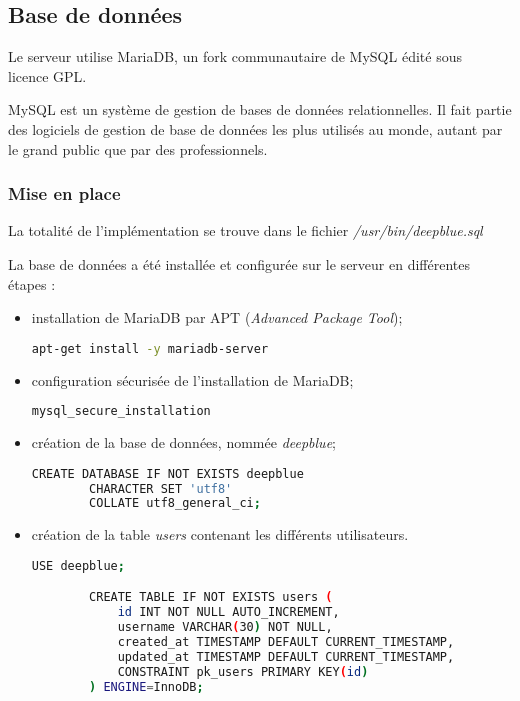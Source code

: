 \subsection{Base de données}
\label{subsec:bd}

Le serveur utilise MariaDB, un fork communautaire de MySQL édité sous \\
licence GPL.

MySQL est un système de gestion de bases de données relationnelles. Il fait
partie des logiciels de gestion de base de données les plus utilisés au monde,
autant par le grand public que par des professionnels.

\subsubsection{Mise en place}
\label{subsubsec:mise-en-place}

La totalité de l'implémentation se trouve dans le fichier
\textit{/usr/bin/deepblue.sql}

La base de données a été installée et configurée sur le serveur en différentes
étapes :
\begin{itemize}
\item installation de MariaDB par APT
  (\emph{Advanced Package Tool});

  \begin{lstlisting}[language=bash]
    apt-get install -y mariadb-server
  \end{lstlisting}

\item configuration sécurisée de l'installation de MariaDB;

  \begin{lstlisting}[language=bash]
    mysql_secure_installation
  \end{lstlisting}

\item création de la base de données, nommée \emph{deepblue};

  \begin{lstlisting}[language=bash]
        CREATE DATABASE IF NOT EXISTS deepblue
        CHARACTER SET 'utf8'
        COLLATE utf8_general_ci;
      \end{lstlisting}

    \item création de la table \og \textit{users} \fg contenant les
      différents utilisateurs.

      \begin{lstlisting}[language=bash]
        USE deepblue;

        CREATE TABLE IF NOT EXISTS users (
            id INT NOT NULL AUTO_INCREMENT,
            username VARCHAR(30) NOT NULL,
            created_at TIMESTAMP DEFAULT CURRENT_TIMESTAMP,
            updated_at TIMESTAMP DEFAULT CURRENT_TIMESTAMP,
            CONSTRAINT pk_users PRIMARY KEY(id)
        ) ENGINE=InnoDB;
      \end{lstlisting}
\end{itemize}

